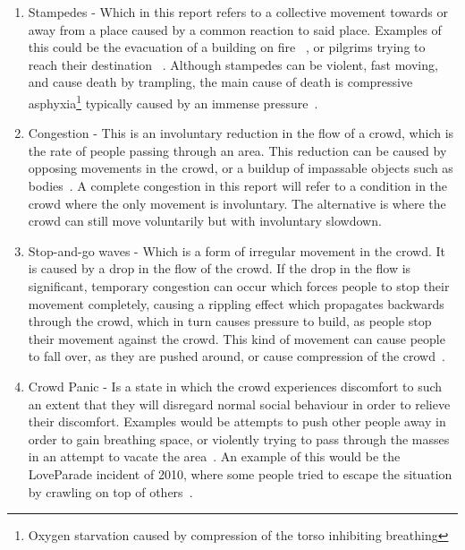 \begin{enumerate}
    \item Stampedes - Which in this report refers to a collective movement towards or away from a place caused by a common reaction to said place. Examples of this could be the evacuation of a building on fire~ \cite{website:Wikipedia-stationclubfire}, or pilgrims trying to reach their destination ~\cite{website:Wikipedia-minastampede}. Although stampedes can be violent, fast moving, and cause death by trampling, the main cause of death is compressive asphyxia\footnote{Oxygen starvation caused by compression of the torso inhibiting breathing} typically caused by an immense pressure~\cite{fruincauses}.
    
    \item Congestion - This is an involuntary reduction in the flow of a crowd, which is the rate of people passing through an area. This reduction can be caused by opposing movements in the crowd, or a buildup of impassable objects such as bodies~\cite{ website:Wikipedia-stationclubfire,website:Wikipedia-meccatunnel}. A complete congestion in this report will refer to a condition in the crowd where the only movement is involuntary. The alternative is where the crowd can still move voluntarily but with involuntary slowdown.
    
    
    \item Stop-and-go waves - Which is a form of irregular movement in the crowd. It is caused by a drop in the flow of the crowd. If the drop in the flow is significant, temporary congestion can occur which forces people to stop their movement completely, causing a rippling effect which propagates backwards through the crowd, which in turn causes pressure to build, as people stop their movement against the crowd. This kind of movement can cause people to fall over, as they are pushed around, or cause compression of the crowd~\cite{empircalstudy,videoanalysis}.
    
    \item Crowd Panic - Is a state in which the crowd experiences discomfort to such an extent that they will disregard normal social behaviour in order to relieve their discomfort. Examples would be attempts to push other people away in order to gain breathing space, or violently trying to pass through the masses in an attempt to vacate the area~\cite{empircalstudy}. An example of this would be the LoveParade incident of 2010, where some people tried to escape the situation by crawling on top of others~\cite{loveParadeDisaster}.
    
\end{enumerate}

